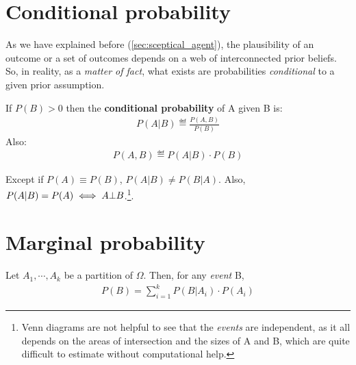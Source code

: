 \section{Conditional probability}
As we have explained before (\cref{sec:sceptical_agent}), the plausibility of an outcome or a set of outcomes depends on a web of interconnected prior beliefs. So, in reality, as a \emph{matter of fact}, what exists are probabilities \emph{conditional} to a given prior assumption.

\begin{definition}
If \(P(B)>0\) then the \textbf{conditional probability} of A given B is:
\begin{align}\label{eq:conditional_probability}
P(A|B) \eqdef \frac{P(A,B)}{P(B)}
\end{align}
Also:
\begin{align}\label{eq:joint_probability}
P(A, B) \eqdef P(A|B)\cdot P(B)
\end{align}
\end{definition}


Except if \(P(A) \equiv P(B)\), \(P(A|B) \neq P(B|A)\). Also, \(P(A|B)=P(A) \iff A \bot B\).\footnote{Venn diagrams are not helpful to see that the \emph{events} are independent, as it all depends on the areas of intersection and the sizes of A and B, which are quite difficult to estimate without computational help.}.

\section{Marginal probability}\label{marginalisation}
\begin{theorem}
Let \(A_1, \cdots, A_k\) be a partition of \(\Omega\). Then, for any \emph{event} B,
\begin{align}
P(B)=\sum_{i=1}^k P(B|A_i)\cdot P(A_i)\label{eq:law_of_total_probabilities} \end{align}
\end{theorem}

